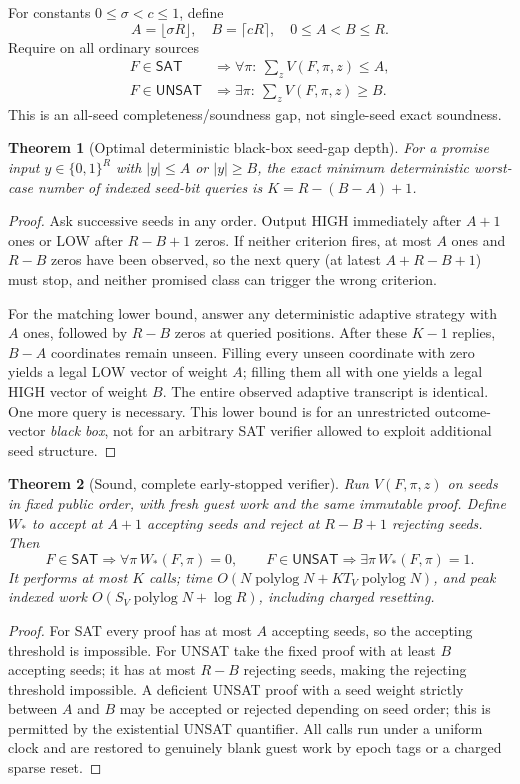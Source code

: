 \documentclass[11pt]{article}
\newtheorem{theorem}{Theorem}
\begin{document}
For constants $0\le\sigma<c\le1$, define
\[
A=\lfloor\sigma R\rfloor,\quad B=\lceil cR\rceil,\quad 0\le A<B\le R.
\]
Require on all ordinary sources
\[
\begin{split}
F\in\mathsf{SAT}&\Rightarrow \forall\pi:\ \sum_zV(F,\pi,z)\le A,\\
F\in\mathsf{UNSAT}&\Rightarrow \exists\pi:\ \sum_zV(F,\pi,z)\ge B.
\end{split}\tag{1}
\]
This is an all-seed completeness/soundness gap, not single-seed exact soundness.

\begin{theorem}[Optimal deterministic black-box seed-gap depth]
For a promise input $y\in\{0,1\}^R$ with $|y|\le A$ or $|y|\ge B$, the exact minimum deterministic worst-case number of indexed seed-bit queries is $K=R-(B-A)+1$.
\end{theorem}
\begin{proof}
Ask successive seeds in any order. Output HIGH immediately after $A+1$ ones or LOW after $R-B+1$ zeros. If neither criterion fires, at most $A$ ones and $R-B$ zeros have been observed, so the next query (at latest $A+R-B+1$) must stop, and neither promised class can trigger the wrong criterion.

For the matching lower bound, answer any deterministic adaptive strategy with $A$ ones, followed by $R-B$ zeros at queried positions. After these $K-1$ replies, $B-A$ coordinates remain unseen. Filling every unseen coordinate with zero yields a legal LOW vector of weight $A$; filling them all with one yields a legal HIGH vector of weight $B$. The entire observed adaptive transcript is identical. One more query is necessary. This lower bound is for an unrestricted outcome-vector \emph{black box}, not for an arbitrary SAT verifier allowed to exploit additional seed structure.
\end{proof}

\begin{theorem}[Sound, complete early-stopped verifier]
Run $V(F,\pi,z)$ on seeds in fixed public order, with fresh guest work and the same immutable proof. Define $W_*$ to accept at $A+1$ accepting seeds and reject at $R-B+1$ rejecting seeds. Then
\[
F\in\mathsf{SAT}\Rightarrow\forall\pi\,W_*(F,\pi)=0,\qquad
F\in\mathsf{UNSAT}\Rightarrow\exists\pi\,W_*(F,\pi)=1.
\tag{2}
\]
It performs at most $K$ calls; time $O(N\operatorname{polylog}N+KT_V\operatorname{polylog}N)$, and peak indexed work $O(S_V\operatorname{polylog}N+\log R)$, including charged resetting.
\end{theorem}
\begin{proof}
For SAT every proof has at most $A$ accepting seeds, so the accepting threshold is impossible. For UNSAT take the fixed proof with at least $B$ accepting seeds; it has at most $R-B$ rejecting seeds, making the rejecting threshold impossible. A deficient UNSAT proof with a seed weight strictly between $A$ and $B$ may be accepted or rejected depending on seed order; this is permitted by the existential UNSAT quantifier. All calls run under a uniform clock and are restored to genuinely blank guest work by epoch tags or a charged sparse reset.
\end{proof}
\end{document}
